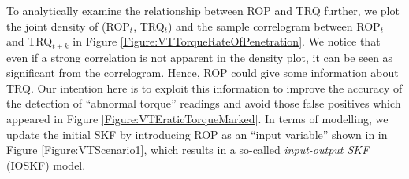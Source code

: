 To analytically examine the relationship between ROP and TRQ further, we plot the joint density of (ROP$_t$, TRQ$_t$) and the sample correlogram between ROP$_t$ and TRQ$_{t+k}$ in Figure \ref{Figure:VTTorqueRateOfPenetration}. We notice that even if a strong correlation is not apparent in the density plot, it can be seen as significant from the correlogram. Hence, ROP could give some information about TRQ. Our intention here is to exploit this information to improve the accuracy of the detection of ``abnormal torque'' readings and avoid those false positives which appeared in Figure \ref{Figure:VTEraticTorqueMarked}. In terms of modelling, we update the initial SKF by introducing ROP as an ``input variable'' shown in  in Figure \ref{Figure:VTScenario1}, which results in a so-called \textit{input-output SKF} (IOSKF) model. 

